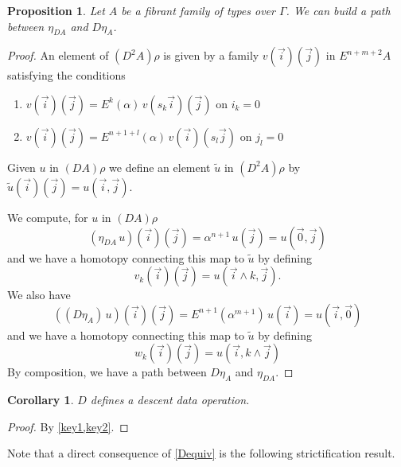 \documentclass[10pt,a4paper,draft]{article}
\newcommand{\D}{D}              %
\newcommand{\E}{E}
\renewcommand{\~}{\widetilde}
\newtheorem{corollary}[theorem]{Corollary}
\newtheorem{proposition}[theorem]{Proposition}
\theoremstyle{definition}
\theoremstyle{remark} %
\begin{document}
\begin{proposition}\label{key2}
  Let $A$ be a fibrant family of types over $\Gamma$.
  We can build a path between $\eta_{\D A}$ and $\D\eta_A$.
\end{proposition}

\begin{proof}
  An element of $(\D^2A)\rho$ is given by a family $v(\vec{i})(\vec{j})$
  in $\E^{n+m+2}A$
  satisfying the conditions
\begin{enumerate}
\item $v(\vec{i})(\vec{j}) = \E^k(\alpha)\, v(s_k\vec{i})(\vec{j})$ on $i_k=0$
\item $v(\vec{i})(\vec{j}) = \E^{n+1+l}(\alpha)\, v(\vec{i})(s_l\vec{j})$ on $j_l=0$
\end{enumerate}
Given $u$ in $(\D A)\rho$ we define an element $\tilde{u}$ in $(\D^2A)\rho$
by $\tilde{u}(\vec{i})(\vec{j}) = u(\vec{i},\vec{j})$.

We compute, for $u$ in $(\D A)\rho$
%
\begin{equation*}
(\eta_{\D A}\, u)(\vec{i})(\vec{j}) = \alpha^{n+1}\, u(\vec{j}) = {u}(\vec{0},\vec{j})
\end{equation*}
%
and we have a homotopy connecting this map to $\tilde{u}$ by defining
%
\begin{equation*}
v_k(\vec{i})(\vec{j}) = u(\vec{i}\wedge k,\vec{j}).
\end{equation*}
%
We also have
%
\begin{equation*}
((\D\eta_A)\, u)(\vec{i})(\vec{j}) =
\E^{n+1}(\alpha^{m+1})\,u(\vec{i}) = {u}(\vec{i},\vec{0})
\end{equation*}
%
and we have a homotopy connecting this map to $\tilde{u}$ by defining
%
\begin{equation*}
w_k(\vec{i})(\vec{j}) = u(\vec{i},k\wedge \vec{j})
\end{equation*}
%
By composition, we have a path between $\D\eta_A$ and $\eta_{\D A}$.
\end{proof}

\begin{corollary}
$\D$ defines a descent data operation.
\end{corollary}

\begin{proof}
  By \cref{key1,key2}.
\end{proof}

Note that a direct consequence of \cref{Dequiv} is the following
strictification result.
\end{document}
